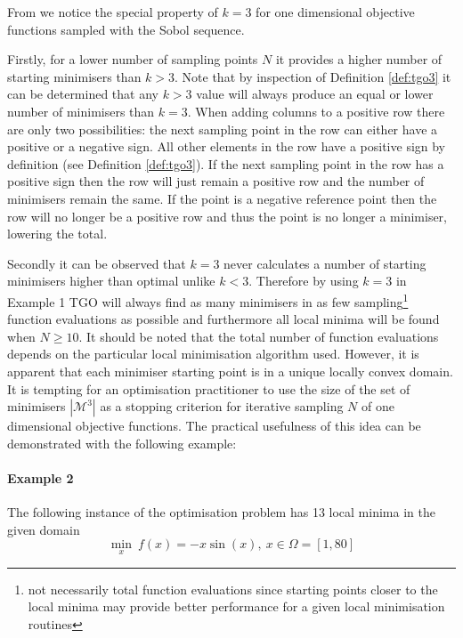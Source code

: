 From  we notice the special property of $k = 3$ for one dimensional objective functions sampled with the Sobol sequence. 

Firstly, for a lower number of sampling points $N$ it provides a higher number of starting minimisers than $k > 3$. Note that by inspection of Definition \ref{def:tgo3} it can be determined that any $k > 3$ value will always produce an equal or lower number of minimisers than $k = 3$. When adding columns to a positive row there are only two possibilities: the next sampling point in the row can either have a positive or a negative sign. All other elements in the row have a positive sign by definition (see Definition \ref{def:tgo3}). If the next sampling point in the row has a positive sign then the row will just remain a positive row and the number of minimisers remain the same. If the point is a negative reference point then the row will no longer be a positive row and thus the point is no longer a minimiser, lowering the total.

Secondly it can be observed that $k = 3$ never calculates a number of starting minimisers higher than optimal unlike $k < 3$. Therefore by using $k = 3$ in Example 1 TGO will always find as many minimisers in as few sampling\footnote{not necessarily total function evaluations since starting points closer to the local minima may provide better performance for a given local minimisation routines} function evaluations as possible and furthermore all local minima will be found when $N \ge 10$. It should be noted that the total number of function evaluations depends on the particular local minimisation algorithm used. However, it is apparent that each minimiser starting point is in a unique locally convex domain. It is tempting for an optimisation practitioner to use the size of the set of minimisers $|\mathcal{M}^3|$ as a stopping criterion for iterative sampling $N$ of one dimensional objective functions. The practical usefulness of this idea can be demonstrated with the following example:

\paragraph{Example 2} The following instance of the optimisation problem has 13 local minima in the given domain
\begin{equation} \label{eq:test2}
\underset{x}{\min} ~f(x) = -x \sin(x), ~ x  \in  \Omega = [1, 80]
\end{equation}


